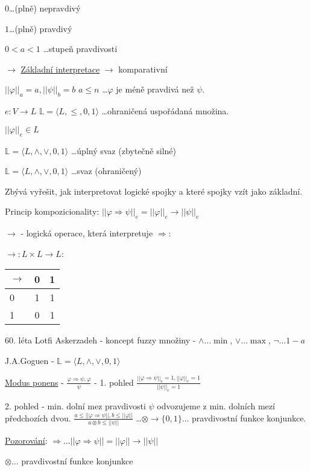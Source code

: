 \documentclass[10pt, a4paper, titlepage]{article}
\theoremstyle{note}
\begin{document}
  $0$\dots (plně) nepravdivý

  $1$\dots (plně) pravdivý

  $0 < a < 1$ \dots stupeň pravdivosti

$\rightarrow$ \underline{Základní interpretace} $\rightarrow$ komparativní

$||\varphi||_{a} = a, ||\psi||_{b}=b$ $a \leq n$ \dots $\varphi$ je méně pravdivá než $\psi$.

$e: V\rightarrow L$ $\mathbb{L} = \langle L, \leq, 0, 1\rangle$ \dots ohraničená uspořádaná množina.

$||\varphi||_{e} \in L$

$\mathbb{L} = \langle L, \wedge, \vee, 0, 1\rangle$ \dots úplný svaz (zbytečně silné)

$\mathbb{L} = \langle L, \wedge, \vee, 0, 1\rangle$ \dots svaz (ohraničený)

Zbývá vyřešit, jak interpretovat logické spojky a které spojky vzít jako základní.

Princip kompozicionality: $||\varphi\Rightarrow\psi||_{e} = ||\varphi||_{e}\rightarrow||\psi||_{e}$

$\rightarrow$ - logická operace, která interpretuje $\Rightarrow$: 

$\rightarrow : L\times L \rightarrow L$:
 \begin{tabular}{l|*2c}
     \bf $\rightarrow$ & 0 & 1  \\
     \hline
    0 & 1& 1 \\
    1 & 0 & 1 \\
   \end{tabular}

60. léta Lotfi Askerzadeh - koncept fuzzy množiny - $\wedge\dots\min$, $\vee\dots\max$, $\neg \dots 1-a$

J.A.Goguen - $\mathbb{L} = \langle L, \wedge, \vee, 0, 1\rangle$

\underline{Modus ponens} - $\frac{\varphi\Rightarrow\psi,\varphi}{\psi}$ - 1. pohled $\frac{||\varphi\Rightarrow\psi||_{e}=1,||\varphi||_{e} = 1}{||\psi||_{e}=1}$

2. pohled - min. dolní mez pravdivosti $\psi$ odvozujeme z min. dolních mezí předchozích dvou. $\frac{a\leq||\varphi\Rightarrow\psi||, b\leq ||\varphi||}{a\otimes b\leq||\psi||}$ \dots$\otimes\rightarrow\{0,1\}\dots$ pravdivostní funkce konjunkce.

\underline{Pozorování}: $\Rightarrow\dots||\varphi\Rightarrow\psi|| = ||\varphi||\rightarrow||\psi||$

  $\otimes\dots$ pravdivostní funkce konjunkce
\end{document}

